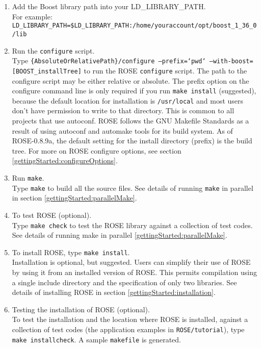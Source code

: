 \begin{enumerate}
     \item Add the Boost library path into your LD\_LIBRARY\_PATH.\\
           For example: {\tt
           LD\_LIBRARY\_PATH=\$LD\_LIBRARY\_PATH:/home/youraccount/opt/boost\_1\_36\_0/lib}
     \item Run the {\tt configure} script. \\
           Type {\tt \{AbsoluteOrRelativePath\}/configure --prefix=`pwd` --with-boost=[BOOST\_installTree]} 
           to run the ROSE {\tt configure} script.  The path to the configure script 
           may be either relative or absolute. The prefix option on the configure 
           command line is only required if you run {\tt make install} (suggested), because 
           the default location for installation is {\tt \//usr\//local} and most users don't
           have permission to write to that directory. This is common to all projects that
           use autoconf.  ROSE follows the GNU Makefile Standards as a result of using
           autoconf and automake tools for its build system. As of ROSE-0.8.9a, the
           default setting for the install directory (prefix) is the build tree.
           For more on ROSE configure options, see section \ref{gettingStarted:configureOptions}.
     \item Run {\tt make}. \\
           Type {\tt make} to build all the source files. See details of running 
           {\tt make} in parallel in section \ref{gettingStarted:parallelMake}.
     \item To test ROSE (optional). \\
           Type {\tt make check} to test the ROSE library against a collection of test codes.
           See details of running make in parallel \ref{gettingStarted:parallelMake}.
     \item To install ROSE, type {\tt make install}. \\
           Installation is optional, but suggested. Users can simplify their use of ROSE 
           by using it from an installed version of ROSE.  This permits compilation 
           using a single include directory and the specification of only two libraries.
           See details of installing ROSE in section \ref{gettingStarted:installation}.
     \item Testing the installation of ROSE (optional). \\
           To test the installation and the location where ROSE is installed, against a
           collection of test codes (the application examples in {\tt ROSE/tutorial}), 
           type {\tt make installcheck}.
           A sample {\tt makefile} is generated.%
\end{enumerate}

